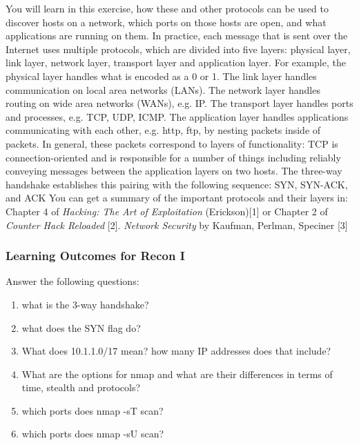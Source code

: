 \documentclass[11pt]{report}
\newcommand{\eat}[1]{}
\begin{document}
You will learn in this exercise, how these and other protocols can be used to discover hosts on a network,
which ports on those hosts are open, and what applications are running on them.
In practice, each message that is sent over the Internet 
uses multiple protocols, which are divided into five layers: physical layer, link layer, network layer,
transport layer and application layer.
For example, the physical layer handles what is encoded as a 0 or 1.
The link layer handles communication on local area networks (LANs).
The network layer handles routing on wide area networks (WANs), e.g. IP.
The transport layer handles ports and processes, e.g. TCP, UDP, ICMP.
The application layer handles applications communicating with each other, e.g. http, ftp,
by nesting packets inside of packets.  In general,
these packets correspond to layers  of functionality:   
TCP is connection-oriented and is responsible for 
a number of things including reliably conveying messages between the application layers on two hosts.  
The three-way handshake establishes this pairing with the following sequence: SYN, SYN-ACK,  and ACK
You can get a summary of the important protocols and their layers in:
Chapter 4 of {\it Hacking: The Art of Exploitation} (Erickson)[1] or Chapter 2 of {\it Counter Hack Reloaded} [2].  
{\it Network Security} by Kaufman, Perlman, Speciner [3]

\subsubsection{Learning Outcomes for Recon I}
Answer the following questions:
\begin{enumerate}
   \item what is the 3-way handshake?
   \item what does the SYN flag do?
   \item What does 10.1.1.0/17 mean?  how many IP addresses does that include?
   \item What are the options for nmap and what are their differences in terms of time, stealth and
   protocols?
   \item which ports does nmap -sT scan?
   \item which ports does nmap -sU scan?
\end{enumerate}

\eat{
\begin{itemize}
\item understanding networking protocols (TCP, UDP, ICMP) and how they can be exploited for recon.
\item developing the security mindset
\item understanding CIDR network configuration and how subdivide a network IP range.
\item use nmap to find hosts and open ports on a network.
\end{itemize}
} %
\end{document}

